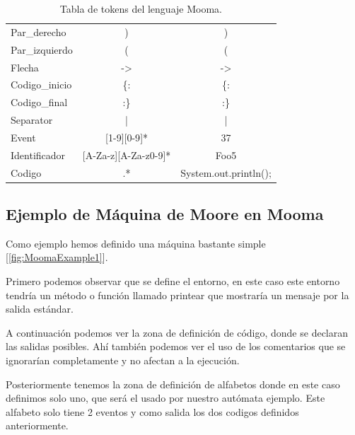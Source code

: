 \documentclass{pre-tfg}
\begin{document}
\begin{table}[htb]
\begin{tabular}{lcc}
Par\_derecho                             & )                            & )                             \\
Par\_izquierdo                           & (                            & (                             \\
Flecha                                   & -\textgreater{}              & -\textgreater{}               \\
Codigo\_inicio                           & \{:                          & \{:                           \\
Codigo\_final                            & :\}                          & :\}                           \\
Separator                                & |                            & |                             \\
Event                                    & {[}1-9{]}{[}0-9{]}*          & 37                            \\
Identificador                            & {[}A-Za-z{]}{[}A-Za-z0-9{]}* & Foo5                          \\
Codigo                                   & .*                           & System.out.println(); \\

\end{tabular}
    \caption{Tabla de tokens del lenguaje Mooma.}
    \label{tab:Tokens}
\end{table}

\subsection{Ejemplo de Máquina de Moore en Mooma}
Como ejemplo hemos definido una máquina bastante simple [\ref{fig:MoomaExample1}].

Primero podemos observar que se define el entorno, en este caso este entorno tendría un método o función llamado printear que mostraría un mensaje por la salida estándar.

A continuación podemos ver la zona de definición de código, donde se declaran las salidas posibles. Ahí también podemos ver el uso de los comentarios que se ignorarían completamente y no afectan a la ejecución.

Posteriormente tenemos la zona de definición de alfabetos donde en este caso definimos solo uno, que será el usado por nuestro autómata ejemplo. Este alfabeto solo tiene 2 eventos y como salida los dos codigos definidos anteriormente.
\end{document}
